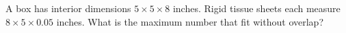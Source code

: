 A box has interior dimensions $5\times5\times8$ inches. Rigid tissue sheets each measure $8\times5\times0.05$ inches. What is the maximum number that fit without overlap?
